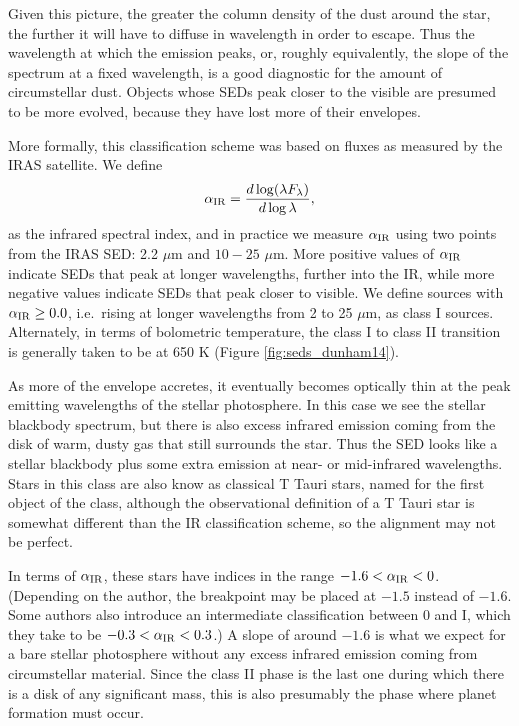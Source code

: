 Given this picture, the greater the column density of the dust around the star, the further it will have to diffuse in wavelength in order to escape. Thus the wavelength at which the emission peaks, or, roughly equivalently, the slope of the spectrum at a fixed wavelength, is a good diagnostic for the amount of circumstellar dust. Objects whose SEDs peak closer to the visible are presumed to be more evolved, because they have lost more of their envelopes.

More formally, this classification scheme was based on fluxes as measured by the IRAS satellite. We define
\begin{equation}
\alpha_{\rm IR} = \frac{d\log (\lambda F_{\lambda})}{d\log\lambda},
\end{equation}
as the infrared spectral index, and in practice we measure $\alpha_{\rm IR}$ using two points from the IRAS SED: 2.2 $\mu$m and $10-25$ $\mu$m. More positive values of $\alpha_{\rm IR}$ indicate SEDs that peak at longer wavelengths, further into the IR, while more negative values indicate SEDs that peak closer to visible. We define sources with $\alpha_{\rm IR}\geq 0.0$, i.e.\ rising at longer wavelengths from 2 to 25 $\mu$m, as class I sources. Alternately, in terms of bolometric temperature, the class I to class II transition is generally taken to be at 650 K (Figure \ref{fig:seds_dunham14}).

As more of the envelope accretes, it eventually becomes optically thin at the peak emitting wavelengths of the stellar photosphere. In this case we see the stellar blackbody spectrum, but there is also excess infrared emission coming from the disk of warm, dusty gas that still surrounds the star. Thus the SED looks like a stellar blackbody plus some extra emission at near- or mid-infrared wavelengths. Stars in this class are also know as classical T Tauri stars, named for the first object of the class, although the observational definition of a T Tauri star is somewhat different than the IR classification scheme, so the alignment may not be perfect.

In terms of $\alpha_{\rm IR}$, these stars have indices in the range $-1.6 < \alpha_{\rm IR} < 0$. (Depending on the author, the breakpoint may  be placed at $-1.5$ instead of $-1.6$. Some authors also introduce an intermediate classification between 0 and I, which they take to be $-0.3 < \alpha_{\rm IR} < 0.3$.) A slope of around $-1.6$ is what we expect for a bare stellar photosphere without any excess infrared emission coming from circumstellar material. Since the class II phase is the last one during which there is a disk of any significant mass, this is also presumably the phase where planet formation must occur.

